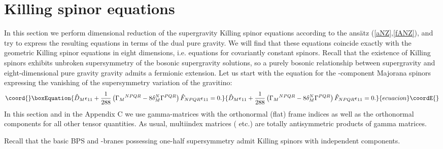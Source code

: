 \documentclass[a4paper,12pt]{article}
\begin{document}
\section{Killing spinor equations} \label{SPINOR}
In this section we perform dimensional reduction of the \coordHE{}
supergravity Killing spinor equations according to the ans\"atz
(\ref{aNZ},\ref{fANZ}), and try to express the resulting
equations in terms of the dual \coordHE{} pure gravity. We will find
that these equations coincide exactly with the geometric
Killing spinor equations in eight dimensions, i.e. equations
for covariantly constant spinors. Recall that the existence of
Killing spinors exhibits unbroken supersymmetry of the bosonic
supergravity solutions, so a purely bosonic relationship
between \coordHE{} supergravity and eight-dimensional pure gravity
gravity admits a fermionic extension. Let us start with the
\coordHE{} equation for the \coordHE{}-component Majorana spinors
\coordHE{} expressing the vanishing of the supersymmetry
variation of the gravitino:
\begin{equation}\coord{}\boxEquation{
\hat D_M \epsilon_{11} + \frac1{288} \left( \Gamma_M{}^{NPQR} - 8
\delta_M^N \Gamma^{PQR} \right) \hat F_{NPQR} \epsilon_{11} = 0.
\label{SE}
}{
\hat D_M \epsilon_{11} + \frac1{288} \left( \Gamma_M{}^{NPQR} - 8
\delta_M^N \Gamma^{PQR} \right) \hat F_{NPQR} \epsilon_{11} = 0.
}{ecuacion}\coordE{}\end{equation}
In this section and in the Appendix C we use gamma-matrices with
the orthonormal (flat) frame indices as well as the orthonormal
components for all other tensor quantities. As usual, multiindex
matrices (\coordHE{} etc.) are totally antisymmetric products
of \coordHE{} gamma matrices.

Recall that the basic BPS \coordHE{} and \coordHE{}-branes
possessing one-half supersymmetry admit Killing spinors with \coordHE{}
independent components.
\end{document}
